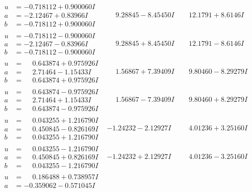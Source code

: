 \documentclass[1p]{elsarticle_modified}
\theoremstyle{definition}
\begin{document}
$$\begin{array}{c|c|c}
\begin{aligned}
u &= -0.718112 + 0.900060 I \\
a &= -2.12467 + 0.83966 I \\
b &= -0.718112 + 0.900060 I\end{aligned}
 & \phantom{-}9.28845 - 8.45450 I & \phantom{-}12.1791 + 8.6146 I \\ \hline\begin{aligned}
u &= -0.718112 - 0.900060 I \\
a &= -2.12467 - 0.83966 I \\
b &= -0.718112 - 0.900060 I\end{aligned}
 & \phantom{-}9.28845 + 8.45450 I & \phantom{-}12.1791 - 8.6146 I \\ \hline\begin{aligned}
u &= \phantom{-}0.643874 + 0.975926 I \\
a &= \phantom{-}2.71464 - 1.15433 I \\
b &= \phantom{-}0.643874 + 0.975926 I\end{aligned}
 & \phantom{-}1.56867 + 7.39409 I & \phantom{-}9.80460 - 8.29279 I \\ \hline\begin{aligned}
u &= \phantom{-}0.643874 - 0.975926 I \\
a &= \phantom{-}2.71464 + 1.15433 I \\
b &= \phantom{-}0.643874 - 0.975926 I\end{aligned}
 & \phantom{-}1.56867 - 7.39409 I & \phantom{-}9.80460 + 8.29279 I \\ \hline\begin{aligned}
u &= \phantom{-}0.043255 + 1.216790 I \\
a &= \phantom{-}0.450845 - 0.826169 I \\
b &= \phantom{-}0.043255 + 1.216790 I\end{aligned}
 & -1.24232 - 2.12927 I & \phantom{-}4.01236 + 3.25160 I \\ \hline\begin{aligned}
u &= \phantom{-}0.043255 - 1.216790 I \\
a &= \phantom{-}0.450845 + 0.826169 I \\
b &= \phantom{-}0.043255 - 1.216790 I\end{aligned}
 & -1.24232 + 2.12927 I & \phantom{-}4.01236 - 3.25160 I \\ \hline\begin{aligned}
u &= \phantom{-}0.186488 + 0.738957 I \\
a &= -0.359062 - 0.571045 I \\

\end{aligned}
\end{array}$$
\end{document}

